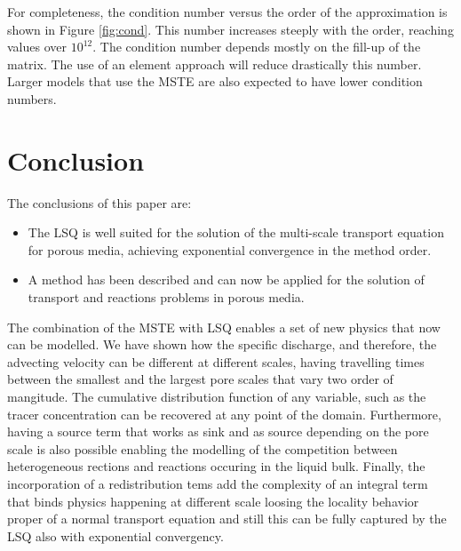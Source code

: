\documentclass{CFD2011}
\newcommand{\newf}[1]{#1}
\newcommand{\nof}[1]{\textcolor{cyan}{}}
\begin{document}

For completeness, the condition number versus the order of the approximation is shown in Figure \ref{fig:cond}. This number increases steeply with the order, reaching values over $10^{12}$. The condition number depends mostly on the fill-up of the matrix. The use of an element approach will reduce drastically this number. Larger models that use the MSTE are also expected to have lower condition numbers.


\section{Conclusion}

The conclusions of this paper are:

\begin{itemize}
\item The \nof{least square high order method}\newf{LSQ} is well suited for the solution of the multi-scale transport equation for porous media\newf{,} achieving exponential convergence in the method order.
\item A method has been described and can now be applied for the solution of transport and reactions problems in porous media.
\end{itemize}

The combination of the MSTE with LSQ enables a set of new physics that now can be modelled. We have shown how the specific discharge, and therefore, the advecting velocity can be different at different scales, having travelling times between the smallest and the largest pore scales that vary two order of mangitude. The cumulative distribution function of any variable, such as the tracer concentration can be recovered at any point of the domain. Furthermore, having a source term that works as sink and as source depending on the pore scale is also possible enabling the modelling of the competition between heterogeneous rections and reactions occuring in the liquid bulk. Finally, the incorporation of a redistribution tems add the complexity of an integral term that binds physics happening at different scale loosing the locality behavior proper of a normal transport equation and still this can be fully captured by the LSQ also with exponential convergency.
\end{document}
